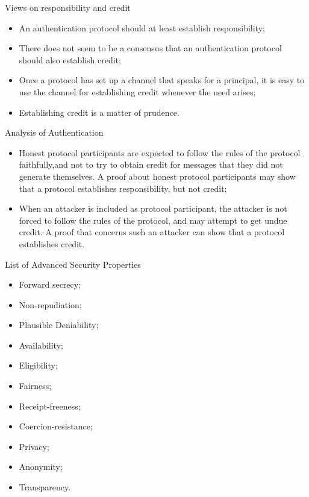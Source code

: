 \documentclass[12pt,table,xcolor={dvipsnames}]{beamer}
\begin{document}
\begin{frame}{Views on responsibility and credit}
\begin{itemize}
\item An authentication protocol should at least establish responsibility;\pause
\item There does not seem to be a consensus that an authentication protocol should also
establish credit;\pause
\item Once a protocol has set up a channel that speaks for a principal, it is easy to use the channel for establishing credit whenever the need arises;\pause
\item Establishing credit is a matter of prudence.
\end{itemize}
\end{frame}

\begin{frame}{Analysis of Authentication}
\begin{itemize}
\item Honest protocol participants are expected to follow the rules of the protocol faithfully,and not to try to obtain credit for messages that they did not generate
themselves. A proof about honest protocol participants may show that a protocol
establishes responsibility, but not credit;\pause
\item When an attacker is included as protocol participant, the attacker is not forced
to follow the rules of the protocol, and may attempt to get undue credit. A proof
that concerns such an attacker can show that a protocol establishes credit.
\end{itemize}
\end{frame}

\begin{frame}{List of Advanced Security Properties}
\begin{itemize}
\item Forward secrecy;\pause
\item Non-repudiation;\pause
\item Plausible Deniability;\pause
\item Availability;\pause
\item Eligibility;\pause
\item Fairness;\pause
\item Receipt-freeness;\pause
\item Coercion-resistance;\pause
\item Privacy; \pause
\item Anonymity;\pause
\item Transparency.
\end{itemize}
\end{frame}
\end{document}
